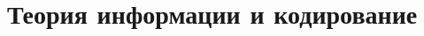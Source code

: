\section{Теория информации и кодирование}
\label{information}

\begin{comment}
\subsection{Основные определения}
Пусть $X$ - дискретная случайная величина, принимающая значения из конечного множества (алфавита) $A = \{a_1,..., a_{|A|}\}$. $P = \{\mathbb{P}\{X = a_i\} = p_{a_i}\}$ - вероятностное распределение $X$ на $A$.

\textit{Условной энтропией} двух с.в. $X \in P$ и $Y \in Q$ называется $H(P|Q) = \sum_{a \in A} \mathbb{P}(Y = a)H(P|Y=a)$, где $H(P|Y=a) = \sum_{a' \in A} \frac{\mathbb{P}(X = a', Y = a)}{\mathbb{P}(Y = a)} \log \frac{\mathbb{P}(X = a', Y = a)}{\mathbb{P}(Y = a)}$. Условная энтропия характеризует ту среднюю степень неопределнности, содержащейся в $X$, если имеется некоторая информация об $Y$.

\begin{definition} \textit{Словом} в алфавите $A$ будем называть реализацию последовательности случайных величин $X_1,...,X_n..$: $w = (x_1...x_n..)$, $x_i \in A$.
\end{definition}

\begin{definition} 
\textit{Энтропией} $H(X)$ случайной величины $X$ распределенной по закону $P$ называется:
\begin{center}
$H(X) = - \sum_{a \in A} p_a\log p_a$, где $\log = \log_2$.
\end{center}
Иногда вместо $H(X)$  используется запись $H(P)$.
Энтропия измеряется в битах и интерпретируется как мера неопределенности или информационного содержания случайной величины. Чем она больше, тем больше неопределенность. В качестве иллюстрации, читателю предлагается решить первую задачу.
\end{definition}
В случае нескольких случайных величин можно определить два тесно связанных понятия: \textit{условной энтропии} и \textit{совместной информации}.
\begin{definition}
\textit{Условной энтропией} двух с.в. $X$ и $Y$ называется $H(X|Y) = \sum_{a \in A} \mathbb{P}(Y = a)H(X|Y=a)$, где $H(X|Y=a) = \sum_{a' \in A} \frac{\mathbb{P}(X = a', Y = a)}{\mathbb{P}(Y = a)} \log \frac{\mathbb{P}(X = a', Y = a)}{\mathbb{P}(Y = a)}$. Условная энтропия характеризует ту среднюю степень неопределнности, содержащейся в $X$, если имеется некоторая информация об $Y$.
\end{definition}


\end{comment}
